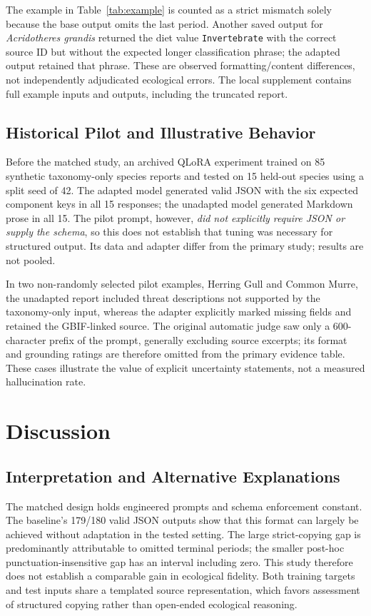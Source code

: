 \documentclass[a4paper,conference,10pt]{IEEEtran}
\begin{document}
The example in Table~\ref{tab:example} is counted as a strict mismatch solely because the base output omits the last period. Another saved output for \textit{Acridotheres grandis} returned the diet value \texttt{Invertebrate} with the correct source ID but without the expected longer classification phrase; the adapted output retained that phrase. These are observed formatting/content differences, not independently adjudicated ecological errors. The local supplement contains full example inputs and outputs, including the truncated report.

\subsection{Historical Pilot and Illustrative Behavior}
Before the matched study, an archived QLoRA experiment trained on 85 synthetic taxonomy-only species reports and tested on 15 held-out species using a split seed of 42. The adapted model generated valid JSON with the six expected component keys in all 15 responses; the unadapted model generated Markdown prose in all 15. The pilot prompt, however, \emph{did not explicitly require JSON or supply the schema}, so this does not establish that tuning was necessary for structured output. Its data and adapter differ from the primary study; results are not pooled.

In two non-randomly selected pilot examples, Herring Gull and Common Murre, the unadapted report included threat descriptions not supported by the taxonomy-only input, whereas the adapter explicitly marked missing fields and retained the GBIF-linked source. The original automatic judge saw only a 600-character prefix of the prompt, generally excluding source excerpts; its format and grounding ratings are therefore omitted from the primary evidence table. These cases illustrate the value of explicit uncertainty statements, not a measured hallucination rate.

\section{Discussion}
\subsection{Interpretation and Alternative Explanations}
The matched design holds engineered prompts and schema enforcement constant. The baseline's 179/180 valid JSON outputs show that this format can largely be achieved without adaptation in the tested setting. The large strict-copying gap is predominantly attributable to omitted terminal periods; the smaller post-hoc punctuation-insensitive gap has an interval including zero. This study therefore does not establish a comparable gain in ecological fidelity. Both training targets and test inputs share a templated source representation, which favors assessment of structured copying rather than open-ended ecological reasoning.
\end{document}
